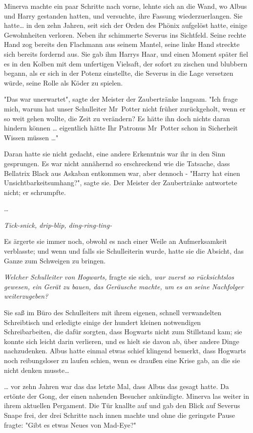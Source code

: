 {Minerva machte ein paar Schritte nach vorne, lehnte sich an die Wand, wo Albus und Harry gestanden hatten, und versuchte, ihre Fassung wiederzuerlangen. Sie hatte… in den zehn Jahren, seit sich der Orden des Phönix aufgelöst hatte, einige Gewohnheiten verloren. Neben ihr schimmerte Severus ins Sichtfeld. Seine rechte Hand zog bereits den Flachmann aus seinem Mantel, seine linke Hand streckte sich bereits fordernd aus. Sie gab ihm Harrys Haar, und einen Moment später fiel es in den Kolben mit dem unfertigen Vielsaft, der sofort zu zischen und blubbern begann, als er sich in der Potenz einstellte, die Severus in die Lage versetzen würde, seine Rolle als Köder zu spielen.

"Das war unerwartet", sagte der Meister der Zaubertränke langsam. "Ich frage mich, warum hat unser Schulleiter Mr~Potter nicht früher zurückgeholt, wenn er so weit gehen wollte, die Zeit zu verändern? Es hätte ihn doch nichts daran hindern können … eigentlich hätte Ihr Patronus Mr~Potter schon in Sicherheit Wissen müssen …"

Daran hatte sie nicht gedacht, eine andere Erkenntnis war ihr in den Sinn gesprungen. Es war nicht annähernd so erschreckend wie die Tatsache, dass Bellatrix Black aus Askaban entkommen war, aber dennoch - "Harry hat einen Unsichtbarkeitsumhang?", sagte sie. Der Meister der Zaubertränke antwortete nicht; er schrumpfte.

…

\emph{Tick-snick, drip-blip, ding-ring-ting-}

Es ärgerte sie immer noch, obwohl es nach einer Weile an Aufmerksamkeit verblasste; und wenn und falls sie Schulleiterin wurde, hatte sie die Absicht, das Ganze zum Schweigen zu bringen.

\emph{Welcher Schulleiter von Hogwarts,} fragte sie sich\emph{, war zuerst so rücksichtslos gewesen, ein Gerät zu bauen, das Geräusche machte, um es an seine Nachfolger weiterzugeben?}

Sie saß im Büro des Schulleiters mit ihrem eigenen, schnell verwandelten Schreibtisch und erledigte einige der hundert kleinen notwendigen Schreibarbeiten, die dafür sorgten, dass Hogwarts nicht zum Stillstand kam; sie konnte sich leicht darin verlieren, und es hielt sie davon ab, über andere Dinge nachzudenken. Albus hatte einmal etwas schief klingend bemerkt, dass Hogwarts noch reibungsloser zu laufen schien, wenn es draußen eine Krise gab, an die sie nicht denken musste…

… vor zehn Jahren war das das letzte Mal, dass Albus das gesagt hatte. Da ertönte der Gong, der einen nahenden Besucher ankündigte. Minerva las weiter in ihrem aktuellen Pergament. Die Tür knallte auf und gab den Blick auf Severus Snape frei, der drei Schritte nach innen machte und ohne die geringste Pause fragte: "Gibt es etwas Neues von Mad-Eye?"

}

